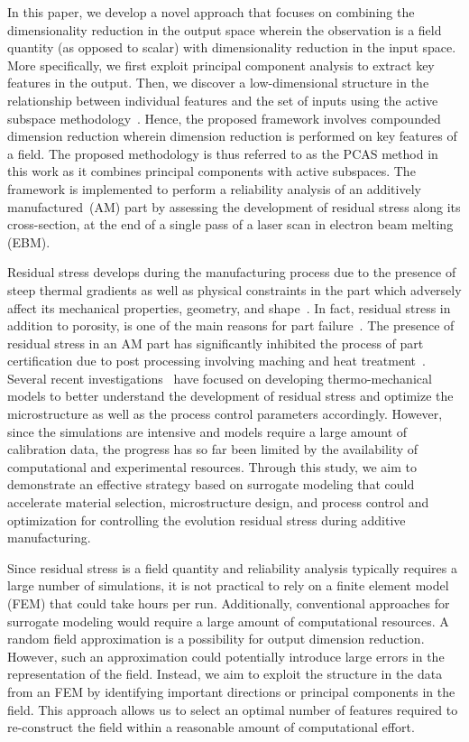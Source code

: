 In this paper, we develop a novel approach that focuses on combining the dimensionality reduction in the output space 
wherein the observation is a field quantity (as opposed to scalar) with dimensionality reduction in the input space. 
More specifically, we first exploit principal component analysis to extract key features in the output. Then, we discover a 
low-dimensional structure in the relationship between individual features and the set of inputs using the active
subspace methodology~\cite{Constantine:2015}. Hence, the proposed framework involves compounded dimension
reduction wherein dimension reduction is performed on key features of a field. The proposed methodology is
thus referred to as the PCAS method in this work as it combines principal components with active subspaces.
The framework is implemented to
perform a reliability analysis of an additively manufactured~(AM) part by assessing the development of residual stress
along its cross-section, at the end of a single pass of a laser scan in electron beam melting (EBM). 

Residual stress develops during the manufacturing process due to the presence of steep thermal gradients as
well as physical constraints in the part which adversely affect its mechanical properties, geometry, and 
shape~\cite{Withers:2001,Mercelis:2006,Hofmann:2014}. 
In fact, residual stress in addition to porosity, is one of the main reasons for 
part failure~\cite{Kim:2018}. The presence of residual stress in an AM part has significantly 
inhibited the process of part certification due to post processing involving maching and heat treatment~\cite{Shiomi:2004}.
Several recent investigations~\cite{Vastola:2016,Hodge:2016,Williams:2018}
have focused on developing thermo-mechanical
models to better understand the development of residual stress and optimize the microstructure as well as
the process control parameters accordingly. However, since the simulations are intensive and models require a 
large amount of calibration data, the progress has so far been limited by the availability
of computational and experimental resources. Through this study, we aim to demonstrate an effective strategy
based on surrogate modeling that could accelerate material selection, microstructure design, and
process control and optimization for controlling the evolution residual stress during additive manufacturing. 

Since residual
stress is a field quantity and reliability analysis typically requires a large number of simulations, it is not practical
to rely on a finite element model (FEM) that could take hours per run. Additionally, conventional approaches for surrogate
modeling would require a large amount of computational resources. A random field approximation is a possibility for
output dimension reduction. However, such an approximation could potentially introduce large errors in the  
representation of the field. Instead, we aim to exploit the structure in the data from an FEM by identifying important 
directions or principal components in the field. This approach allows us to select an optimal number of 
features required to re-construct the field within a reasonable amount of computational effort. 

